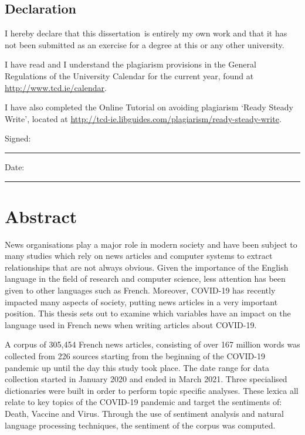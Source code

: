 \documentclass[a4paper,oneside,12pt]{book}
\title{\thesistitle}
\author{\authorname}
\newcommand{\typeofthesis}{dissertation} %
\begin{document}

\section*{\Huge{Declaration}}
\vspace{1cm}
I hereby declare that this \typeofthesis\ is entirely my own work and that it has not been submitted as an exercise for a degree at this or any other university.

\vspace{1cm}
I have read and I understand the plagiarism provisions in the General Regulations of the University Calendar for the current year, found at \url{http://www.tcd.ie/calendar}.
\vspace{1cm}

I have also completed the Online Tutorial on avoiding plagiarism `Ready Steady Write', located at \url{http://tcd-ie.libguides.com/plagiarism/ready-steady-write}.
\vspace{3cm}

Signed:~\rule{5cm}{0.3pt}\hfill Date:~\rule{5cm}{0.3pt}

\chapter*{Abstract}

News organisations play a major role in modern society and have been subject to many studies which rely on news articles and computer systems to extract relationships that are not always obvious. Given the importance of the English language in the field of research and computer science, less attention has been given to other languages such as French. Moreover, COVID-19 has recently impacted many aspects of society, putting news articles in a very important position. This thesis sets out to examine which variables have an impact on the language used in French news when writing articles about COVID-19.

A corpus of 305,454 French news articles, consisting of over 167 million words was collected from 226 sources starting from the beginning of the COVID-19 pandemic up until the day this study took place. The date range for data collection started in January 2020 and ended in March 2021. Three specialised dictionaries were built in order to perform topic specific analyses. These lexica all relate to key topics of the COVID-19 pandemic and target the sentiments of: Death, Vaccine and Virus. Through the use of sentiment analysis and natural language processing techniques, the sentiment of the corpus was computed.
\end{document}
